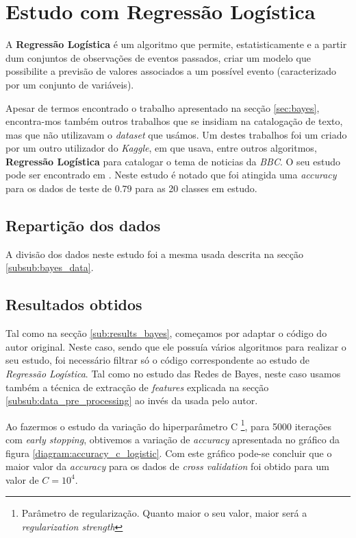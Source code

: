 \section{Estudo com Regressão Logística}

A \textbf{Regressão Logística} é um algoritmo que permite, estatisticamente e a partir dum conjuntos de observações de eventos passados, criar um modelo que possibilite a previsão de valores associados a um possível evento (caracterizado por um conjunto de variáveis).

Apesar de termos encontrado o trabalho apresentado na secção \ref{sec:bayes}, encontra-mos também outros trabalhos que se insidiam na catalogação de texto, mas que não utilizavam o \textit{dataset} que usámos. Um destes trabalhos foi um criado por um outro utilizador do \textit{Kaggle}, em que usava, entre outros algoritmos, \textbf{Regressão Logística} para catalogar o tema de noticias da \textit{BBC}. O seu estudo pode ser encontrado em \cite{kaggle_logistic}. Neste estudo é notado que foi atingida uma \textit{accuracy} para os dados de teste de $0.79$ para as 20 classes em estudo.

\subsection{Repartição dos dados}
A divisão dos dados neste estudo foi a mesma usada descrita na secção \ref{subsub:bayes_data}.


\subsection{Resultados obtidos}

Tal como na secção \ref{sub:results_bayes}, começamos por adaptar o código do autor original. Neste caso, sendo que ele possuía vários algoritmos para realizar o seu estudo, foi necessário filtrar só o código correspondente ao estudo de \textit{Regressão Logística}. Tal como no estudo das Redes de Bayes, neste caso usamos também a técnica de extracção de \textit{features} explicada na secção \ref{subsub:data_pre_processing} ao invés da usada pelo autor.

Ao fazermos o estudo da variação do hiperparâmetro C \footnote{Parâmetro de regularização. Quanto maior o seu valor, maior será a \textit{regularization strength}}, para 5000 iterações com \textit{early stopping}, obtivemos a variação de \textit{accuracy} apresentada no gráfico da figura \ref{diagram:accuracy_c_logistic}. Com este gráfico pode-se concluir que o maior valor da \textit{accuracy} para os dados de \textit{cross validation} foi obtido para um valor de $C = 10^{4}$.

